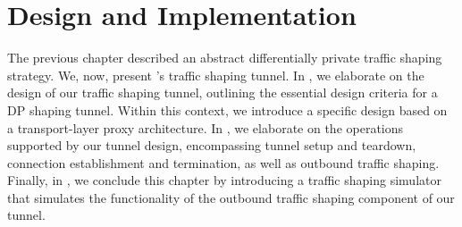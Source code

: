 \chapter{Design and Implementation}\label{ch:design}
The previous chapter described an abstract differentially private traffic shaping strategy.
We, now, present \sys's traffic shaping tunnel.
In , we elaborate on the design of our traffic shaping tunnel,  outlining the essential design criteria for a DP shaping tunnel.
Within this context, we introduce a specific design based on a transport-layer proxy architecture.
In , we elaborate on the operations supported by our tunnel design, encompassing tunnel setup and teardown, connection establishment and termination, as well as outbound traffic shaping.
Finally, in , we conclude this chapter by introducing a traffic shaping simulator that simulates the functionality of the outbound traffic shaping component of our tunnel.



